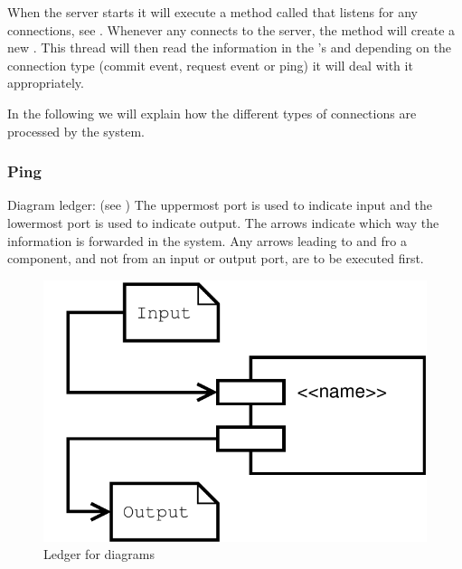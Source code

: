 When the server starts it will execute a method called  that listens for any connections, see .
Whenever any  connects to the server, the  method will create a new .
This thread will then read the information in the 's  and depending on the connection type (commit event, request event or ping) it will deal with it appropriately.



In the following we will explain how the different types of connections are processed by the system.


\subsubsection*{Ping}
Diagram ledger: (see )\newline
The uppermost port is used to indicate input and the lowermost port is used to indicate output. The arrows indicate which way the information is forwarded in the system. Any arrows leading to and fro a component, and not from an input or output port, are to be executed first.	\newline
\begin{figure}[H]
	\centering
		\includegraphics[scale=0.40]{images/ledger} %
	\caption{Ledger for diagrams}
	\label{fig:IOLedger}
\end{figure}

